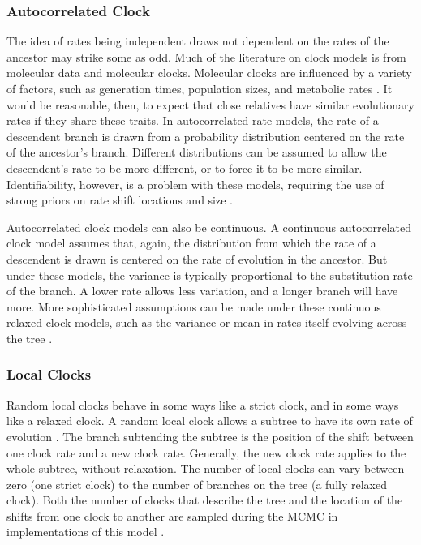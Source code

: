 \documentclass[11pt]{article}
\begin{document}
\subsubsection{Autocorrelated Clock}
The idea of rates being independent draws not dependent on the rates of the ancestor may strike some as odd. 
Much of the literature on clock models is from molecular data and molecular clocks.
Molecular clocks are influenced by a variety of factors, such as generation times, population sizes, and metabolic rates \cite{bromham1996, gaut1992}.
It would be reasonable, then, to expect that close relatives have similar evolutionary rates if they share these traits.
In autocorrelated rate models, the rate of a descendent branch is drawn from a probability distribution \cite{Aris-Brosou2002}  centered on the rate of the ancestor's branch. 
Different distributions can be assumed to allow the descendent's rate to be more different, or to force it to be more similar. 
Identifiability, however, is a problem with these models, requiring the use of strong priors on rate shift locations and size \cite{Rannala2002, Ronquist2012a}.

Autocorrelated clock models can also be continuous.
A continuous autocorrelated clock model assumes that, again, the distribution from which the rate of a descendent is drawn is centered on the rate of evolution in the ancestor.
But under these models, the variance is typically proportional to the substitution rate of the branch. 
A lower rate allows less variation, and a longer branch will have more.
More sophisticated assumptions can be made under these continuous relaxed clock models, such as the variance or mean in rates itself evolving across the tree \cite{Thorne1998, Kishino2001, Thorne2002, Aris-Brosou2002, Aris-Brosou2003}.

\subsubsection{Local Clocks}

Random local clocks behave in some ways like a strict clock, and in some ways like a relaxed clock. 
A random local clock allows a subtree to have its own rate of evolution \cite{yoder2000}. 
The branch subtending the subtree is the position of the shift between one clock rate and a new clock rate. 
Generally, the new clock rate applies to the whole subtree, without relaxation.
The number of local clocks can vary between zero (one strict clock) to the number of branches on the tree (a fully relaxed clock).
Both the number of clocks that describe the tree and the location of the shifts from one clock to another are sampled during the MCMC in implementations of this model \cite{Drummond2010}. 
\end{document}
